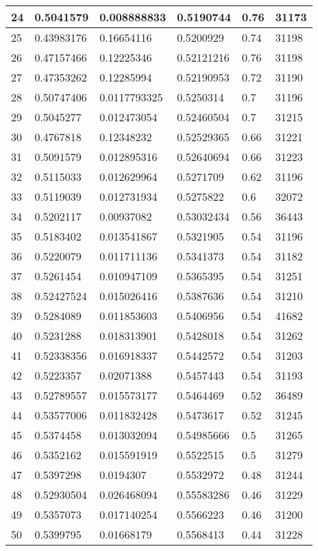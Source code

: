 \begin{longtable}{|l|l|l|l|l|l|}
24 & 0.5041579 & 0.008888833 & 0.5190744 & 0.76 & 31173 \\ \hline 
25 & 0.43983176 & 0.16654116 & 0.5200929 & 0.74 & 31198 \\ \hline 
26 & 0.47157466 & 0.12225346 & 0.52121216 & 0.76 & 31198 \\ \hline 
27 & 0.47353262 & 0.12285994 & 0.52190953 & 0.72 & 31190 \\ \hline 
28 & 0.50747406 & 0.0117793325 & 0.5250314 & 0.7 & 31196 \\ \hline 
29 & 0.5045277 & 0.012473054 & 0.52460504 & 0.7 & 31215 \\ \hline 
30 & 0.4767818 & 0.12348232 & 0.52529365 & 0.66 & 31221 \\ \hline 
31 & 0.5091579 & 0.012895316 & 0.52640694 & 0.66 & 31223 \\ \hline 
32 & 0.5115033 & 0.012629964 & 0.5271709 & 0.62 & 31196 \\ \hline 
33 & 0.5119039 & 0.012731934 & 0.5275822 & 0.6 & 32072 \\ \hline 
34 & 0.5202117 & 0.00937082 & 0.53032434 & 0.56 & 36443 \\ \hline 
35 & 0.5183402 & 0.013541867 & 0.5321905 & 0.54 & 31196 \\ \hline 
36 & 0.5220079 & 0.011711136 & 0.5341373 & 0.54 & 31182 \\ \hline 
37 & 0.5261454 & 0.010947109 & 0.5365395 & 0.54 & 31251 \\ \hline 
38 & 0.52427524 & 0.015026416 & 0.5387636 & 0.54 & 31210 \\ \hline 
39 & 0.5284089 & 0.011853603 & 0.5406956 & 0.54 & 41682 \\ \hline 
40 & 0.5231288 & 0.018313901 & 0.5428018 & 0.54 & 31262 \\ \hline 
41 & 0.52338356 & 0.016918337 & 0.5442572 & 0.54 & 31203 \\ \hline 
42 & 0.5223357 & 0.02071388 & 0.5457443 & 0.54 & 31193 \\ \hline 
43 & 0.52789557 & 0.015573177 & 0.5464469 & 0.52 & 36489 \\ \hline 
44 & 0.53577006 & 0.011832428 & 0.5473617 & 0.52 & 31245 \\ \hline 
45 & 0.5374458 & 0.013032094 & 0.54985666 & 0.5 & 31265 \\ \hline 
46 & 0.5352162 & 0.015591919 & 0.5522515 & 0.5 & 31279 \\ \hline 
47 & 0.5397298 & 0.0194307 & 0.5532972 & 0.48 & 31244 \\ \hline 
48 & 0.52930504 & 0.026468094 & 0.55583286 & 0.46 & 31229 \\ \hline 
49 & 0.5357073 & 0.017140254 & 0.5566223 & 0.46 & 31200 \\ \hline 
50 & 0.5399795 & 0.01668179 & 0.5568413 & 0.44 & 31228 \\ \hline 
\end{longtable}